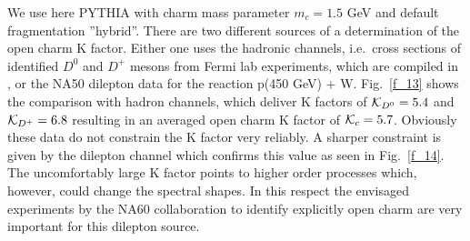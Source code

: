 \begin{appendix}
We use here PYTHIA with charm mass parameter $m_c = 1.5$ GeV
and default fragmentation ''hybrid''.
There are two different sources of a determination of the open charm
K factor. Either one uses the hadronic channels, i.e.\ cross sections
of identified $D^0$ and $D^+$ mesons from Fermi lab experiments,
which are compiled in \cite{PBM}, or the NA50  dilepton
data \cite{pW_Capelli} for the reaction p(450 GeV) + W.
Fig.~\ref{f_13} shows the comparison with hadron channels,
which deliver K factors of ${\cal K}_{D^0} = 5.4$ and 
${\cal K}_{D^+} = 6.8$ resulting in an averaged open charm K factor
of ${\cal K}_c = 5.7$. Obviously these data do not constrain the
K factor very reliably. A sharper constraint is given by the
dilepton channel which confirms this value
as seen in Fig.~\ref{f_14}. 
The uncomfortably large K factor points to higher order processes
which, however, could change the spectral shapes.  
In this respect the envisaged experiments by the NA60 collaboration 
\cite{NA6i} to
identify explicitly open charm are very important for this 
dilepton source.  
\end{appendix}
\newpage
